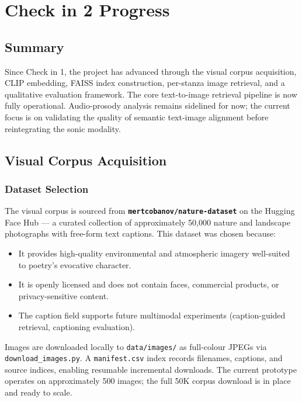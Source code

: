 \documentclass[11pt,a4paper]{article}
\begin{document}
\newpage

\section*{Check in 2 Progress}

\subsection*{Summary}

Since Check in 1, the project has advanced through the visual corpus acquisition, CLIP embedding, FAISS index construction, per-stanza image retrieval, and a qualitative evaluation framework. The core text-to-image retrieval pipeline is now fully operational. Audio-prosody analysis remains sidelined for now; the current focus is on validating the quality of semantic text-image alignment before reintegrating the sonic modality.

\subsection*{Visual Corpus Acquisition}

\subsubsection*{Dataset Selection}

The visual corpus is sourced from \textbf{\texttt{mertcobanov/nature-dataset}} on the Hugging Face Hub --- a curated collection of approximately 50{,}000 nature and landscape photographs with free-form text captions. This dataset was chosen because:
\begin{itemize}
  \item It provides high-quality environmental and atmospheric imagery well-suited to poetry's evocative character.
  \item It is openly licensed and does not contain faces, commercial products, or privacy-sensitive content.
  \item The caption field supports future multimodal experiments (caption-guided retrieval, captioning evaluation).
\end{itemize}

Images are downloaded locally to \texttt{data/images/} as full-colour JPEGs via \texttt{download\_images.py}. A \texttt{manifest.csv} index records filenames, captions, and source indices, enabling resumable incremental downloads. The current prototype operates on approximately 500 images; the full 50K corpus download is in place and ready to scale.
\end{document}

